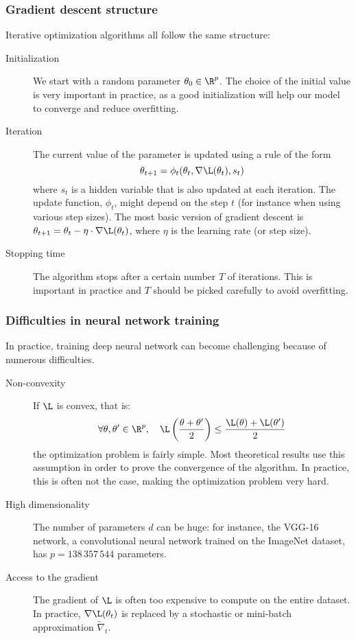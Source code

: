 \subsubsection{Gradient descent structure}
Iterative optimization algorithms all follow the same structure:
\begin{description}
    \item[Initialization] We start with a random parameter $\theta_0\in\R^p$. The choice of the initial value is very important in practice, as a good initialization will help our model to converge and reduce overfitting.
    \item[Iteration] The current value of the parameter is updated using a rule of the form
    \begin{equation*}
        \theta_{t+1}=\phi_t(\theta_t,\nabla\L(\theta_t),s_t)
    \end{equation*}
    where $s_t$ is a hidden variable that is also updated at each iteration. The update function, $\phi_t$, might depend on the step $t$ (for instance when using various step sizes). The most basic version of gradient descent is $\theta_{t+1}=\theta_t-\eta\cdot\nabla\L(\theta_t)$, where $\eta$ is the learning rate (or step size).
    \item[Stopping time] The algorithm stops after a certain number $T$ of iterations. This is important in practice and $T$ should be picked carefully to avoid overfitting.
\end{description}

\subsubsection{Difficulties in neural network training}
In practice, training deep neural network can become challenging because of numerous difficulties.
\begin{description}
    \item[Non-convexity] If $\L$ is convex, that is:
    \begin{equation*}
        \forall\theta,\theta'\in\R^p, \quad \L\left(\frac{\theta+\theta'}{2}\right) \leq \frac{\L(\theta)+\L(\theta')}{2}
    \end{equation*}
    the optimization problem is fairly simple. Most theoretical results use this assumption in order to prove the convergence of the algorithm. In practice, this is often not the case, making the optimization problem very hard.
    \item[High dimensionality] The number of parameters $d$ can be huge: for instance, the VGG-16 network, a convolutional neural network trained on the ImageNet dataset, has $p=138\,357\,544$ parameters.
    \item[Access to the gradient] The gradient of $\L$ is often too expensive to compute on the entire dataset. In practice, $\nabla\L(\theta_t)$ is replaced by a stochastic or mini-batch approximation $\tilde{\nabla}_t$.
\end{description}

